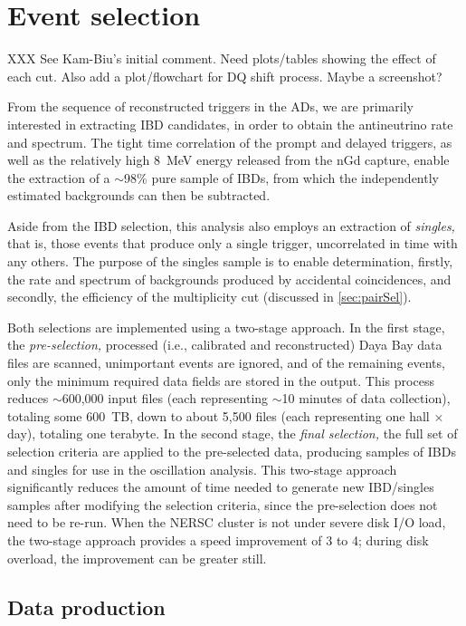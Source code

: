 \documentclass[../thesis.tex]{subfiles}
\begin{document}
\chapter{Event selection}
\label{chap:selection}

XXX See Kam-Biu's initial comment. Need plots/tables showing the effect of each cut. Also add a plot/flowchart for DQ shift process. Maybe a screenshot?

From the sequence of reconstructed triggers in the ADs, we are primarily interested in extracting IBD candidates, in order to obtain the antineutrino rate and spectrum. The tight time correlation of the prompt and delayed triggers, as well as the relatively high 8~MeV energy released from the nGd capture, enable the extraction of a $\sim$98\% pure sample of IBDs, from which the independently estimated backgrounds can then be subtracted.

Aside from the IBD selection, this analysis also employs an extraction of \emph{singles,} that is, those events that produce only a single trigger, uncorrelated in time with any others. The purpose of the singles sample is to enable determination, firstly, the rate and spectrum of backgrounds produced by accidental coincidences, and secondly, the efficiency of the multiplicity cut (discussed in \autoref{sec:pairSel}).

Both selections are implemented using a two-stage approach. In the first stage, the \emph{pre-selection,} processed (i.e., calibrated and reconstructed) Daya Bay data files are scanned, unimportant events are ignored, and of the remaining events, only the minimum required data fields are stored in the output. This process reduces $\sim$600,000 input files (each representing $\sim$10 minutes of data collection), totaling some 600~TB, down to about 5,500 files (each representing one hall $\times$ day), totaling one terabyte. In the second stage, the \emph{final selection,} the full set of selection criteria are applied to the pre-selected data, producing samples of IBDs and singles for use in the oscillation analysis. This two-stage approach significantly reduces the amount of time needed to generate new IBD/singles samples after modifying the selection criteria, since the pre-selection does not need to be re-run. When the NERSC cluster is not under severe disk I/O load, the two-stage approach provides a speed improvement of 3 to 4; during disk overload, the improvement can be greater still.

\section{Data production}
\label{sec:selProd}
\end{document}
